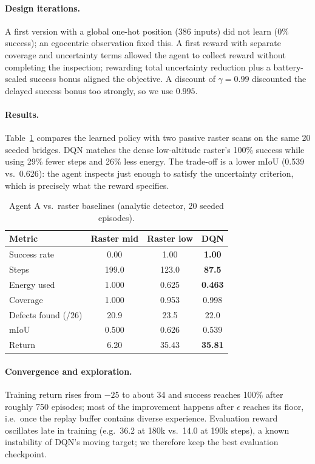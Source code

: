 \paragraph{Design iterations.} A first version with a global one-hot position (386 inputs) did not learn (0\% success);
an egocentric observation fixed this. A first reward with separate coverage and uncertainty terms allowed the agent to collect
reward without completing the inspection; rewarding total uncertainty reduction plus a battery-scaled success bonus aligned the
objective. A discount of $\gamma=0.99$ discounted the delayed success bonus too strongly, so we use $0.995$.

\paragraph{Results.} Table~\ref{tab:agentA} compares the learned policy with two passive raster scans on the same 20 seeded bridges.
DQN matches the dense low-altitude raster's 100\% success while using 29\% fewer steps and 26\% less energy. The trade-off is a
lower mIoU (0.539 vs.\ 0.626): the agent inspects just enough to satisfy the uncertainty criterion, which is precisely what the reward
specifies.

\begin{table}[h]
\centering
\caption{Agent A vs.\ raster baselines (analytic detector, 20 seeded episodes).}
\label{tab:agentA}
\begin{tabular}{lccc}
\hline
Metric & Raster mid & Raster low & \textbf{DQN} \\
\hline
Success rate & 0.00 & 1.00 & \textbf{1.00} \\
Steps & 199.0 & 123.0 & \textbf{87.5} \\
Energy used & 1.000 & 0.625 & \textbf{0.463} \\
Coverage & 1.000 & 0.953 & 0.998 \\
Defects found (/26) & 20.9 & 23.5 & 22.0 \\
mIoU & 0.500 & 0.626 & 0.539 \\
Return & 6.20 & 35.43 & \textbf{35.81} \\
\hline
\end{tabular}
\end{table}

\paragraph{Convergence and exploration.} Training return rises from $-25$ to about 34 and success reaches 100\% after roughly
750 episodes; most of the improvement happens after $\epsilon$ reaches its floor, i.e.\ once the replay buffer contains diverse
experience. Evaluation reward oscillates late in training (e.g.\ 36.2 at 180k vs.\ 14.0 at 190k steps), a known instability of DQN's
moving target; we therefore keep the best evaluation checkpoint.

